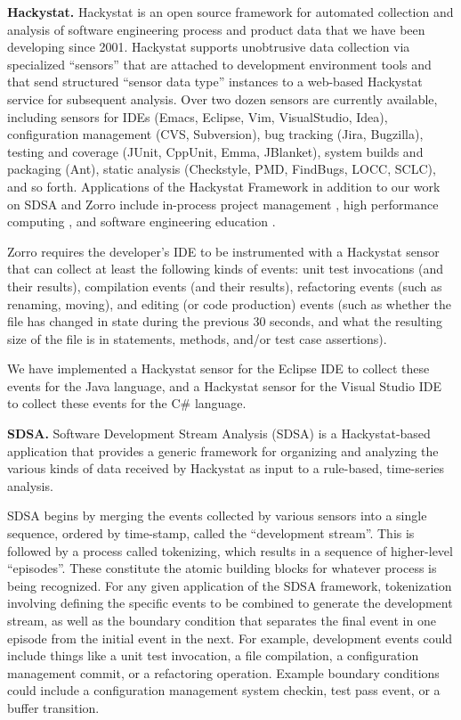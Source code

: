 \documentclass[smallextended]{svjour3}     %
\begin{document}
{\bf Hackystat.} Hackystat is an open source framework for automated
collection and analysis of software engineering process and product data
that we have been developing since 2001. Hackystat supports unobtrusive
data collection via specialized ``sensors'' that are attached to
development environment tools and that send structured ``sensor data type''
instances to a web-based Hackystat service for subsequent analysis.  Over
two dozen sensors are currently available, including sensors for IDEs
(Emacs, Eclipse, Vim, VisualStudio, Idea), configuration management (CVS,
Subversion), bug tracking (Jira, Bugzilla), testing and coverage (JUnit,
CppUnit, Emma, JBlanket), system builds and packaging (Ant), static
analysis (Checkstyle, PMD, FindBugs, LOCC, SCLC), and so forth.
Applications of the Hackystat Framework in addition to our work on SDSA and
Zorro include in-process project management \citep{csdl2-04-11}, high
performance computing \citep{csdl2-04-22}, and software engineering
education \citep{csdl2-03-12}.

Zorro requires the developer's IDE to be instrumented with a Hackystat
sensor that can collect at least the following kinds of events: unit test
invocations (and their results), compilation events (and their results),
refactoring events (such as renaming, moving), and editing (or code
production) events (such as whether the file has changed in state during
the previous 30 seconds, and what the resulting size of the file is in
statements, methods, and/or test case assertions).

We have implemented a Hackystat sensor for the Eclipse IDE to collect these
events for the Java language, and a Hackystat sensor for the Visual Studio
IDE to collect these events for the C\# language.


{\bf SDSA.} Software Development Stream Analysis (SDSA) is a Hackystat-based application that
provides a generic framework for organizing and analyzing the various kinds
of data received by Hackystat as input to a rule-based, time-series
analysis.

SDSA begins by merging the events collected by various sensors into a
single sequence, ordered by time-stamp, called the ``development stream''.
This is followed by a process called tokenizing, which results in a
sequence of higher-level ``episodes''.  These constitute the atomic
building blocks for whatever process is being recognized.  For any given
application of the SDSA framework, tokenization involving defining the
specific events to be combined to generate the development stream, as well
as the boundary condition that separates the final event in one episode
from the initial event in the next. For example, development events could
include things like a unit test invocation, a file compilation, a
configuration management commit, or a refactoring operation.  Example
boundary conditions could include a configuration management system
checkin, test pass event, or a buffer transition.
\end{document}
